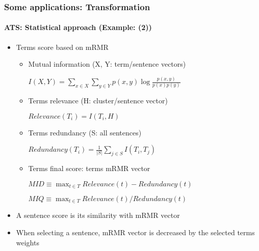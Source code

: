 \documentclass[xcolor=table]{beamer}
\begin{document}
\begin{frame}
	\frametitle{Some applications: Transformation}
	\framesubtitle{ATS: Statistical approach (Example: \cite{15-oufaida-al} (2))}

	\begin{itemize}
		\item Terms score based on mRMR
		\begin{itemize}
			\item Mutual information (X, Y: term/sentence vectors) 
			
			\begin{center}
				$I(X, Y) = \sum\limits_{x \in X} \sum\limits_{y \in Y} p(x, y) \log \frac{p(x, y)}{p(x) p(y)}$
			\end{center}
			
			\item Terms relevance (H: cluster/sentence vector)
			\begin{center}
				$Relevance(T_i) = I(T_i, H)$
			\end{center}
			
			\item Terms redundancy (S: all sentences)
			
			\begin{center}
				$Redundancy(T_i) = \frac{1}{|S|} \sum\limits_{j \in S} I(T_i, T_j)$
			\end{center}
			
			\item Terms final score: terms mRMR vector
			
			\begin{center}
				$MID \equiv \max_{t \in T} Relevance(t) - Redundancy(t)$
			
			$MIQ \equiv \max_{t \in T} Relevance(t) / Redundancy(t)$
			\end{center}
		\end{itemize}
		
		\item A sentence score is its similarity with mRMR vector
		
		\item When selecting a sentence, mRMR vector is decreased by the selected terms weights
	\end{itemize}
	
\end{frame}
\end{document}
